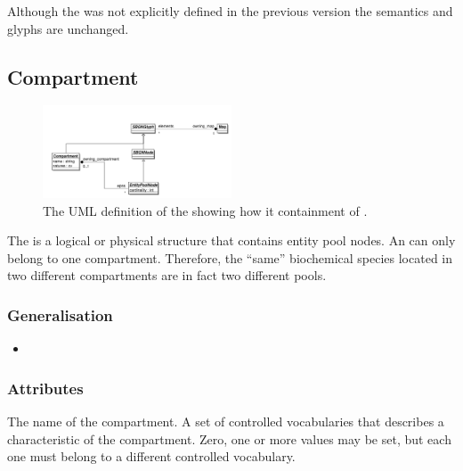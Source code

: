 Although the  was not explicitly defined in
the previous version the semantics and glyphs are unchanged.
 
\subsection{Compartment}
\label{defn:Compartment}

\begin{figure}[htb]
  \centering
  \includegraphics[width = 0.5\textwidth]{images/compartmentuml}
  \caption{The UML definition of the  showing
    how it containment of .}
  \label{fig:compartmentuml}
\end{figure}

The  is a logical or physical structure that
contains entity pool nodes. An  can only
belong to one compartment. Therefore, the ``same'' biochemical species
located in two different compartments are in fact two different pools.


\subsubsection{Generalisation}

\begin{itemize}
\item {}
\end{itemize}

\subsubsection{Attributes}

\begin{attributes}
   The name of the compartment.
   A set of controlled vocabularies that describes
  a characteristic of the compartment. Zero, one or more values may be
  set, but each one must belong to a different controlled vocabulary.
\end{attributes}

